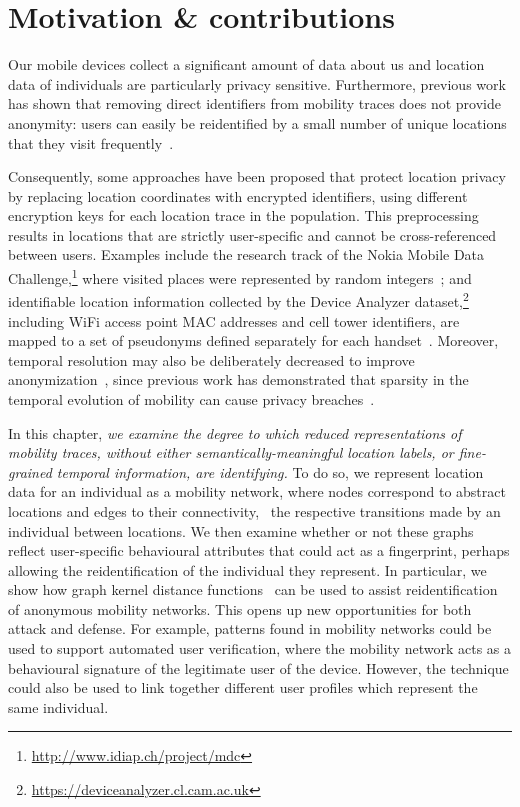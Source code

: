 \section{Motivation \& contributions}

Our mobile devices collect a significant amount of data about us and location data of individuals are particularly privacy sensitive.
Furthermore, previous work has shown that removing direct identifiers from mobility traces does not provide anonymity: users can easily be reidentified by a small number of unique locations that they visit frequently~\citep{DeMontjoye2013, Zang2011}.

Consequently, some approaches have been proposed that protect location privacy by replacing location coordinates with encrypted identifiers, using different encryption keys for each location trace in the population.
This preprocessing results in locations that are strictly user-specific and cannot be cross-referenced between users.
Examples include the research track of the Nokia Mobile Data Challenge,\footnote{\url{http://www.idiap.ch/project/mdc}} where visited places were represented by random integers~\citep{Laurila}; and identifiable location information collected by the Device Analyzer dataset,\footnote{\url{https://deviceanalyzer.cl.cam.ac.uk}} including WiFi access point MAC addresses and cell tower identifiers, are mapped to a set of pseudonyms defined separately for each handset~\citep{Wagner2014}.
Moreover, temporal resolution may also be deliberately decreased to improve anonymization~\citep{Gruteser}, since previous work has demonstrated that sparsity in the temporal evolution of mobility can cause privacy breaches~\citep{DeMontjoye2013}.

In this chapter, \emph{we examine the degree to which reduced representations of mobility traces, without either semantically-meaningful location labels, or fine-grained temporal information, are identifying.}
To do so, we represent location data for an individual as a mobility network, where nodes correspond to abstract locations and edges to their connectivity, \ie\ the respective transitions made by an individual between locations.
We then examine whether or not these graphs reflect user-specific behavioural attributes that could act as a fingerprint, perhaps allowing the reidentification of the individual they represent.
In particular, we show how graph kernel distance functions~\citep{Vishwanathan2010} can be used to assist reidentification of anonymous mobility networks.
This opens up new opportunities for both attack and defense.
For example, patterns found in mobility networks could be used to support automated user verification, where the mobility network acts as a behavioural signature of the legitimate user of the device.
However, the technique could also be used to link together different user profiles which represent the same individual.

